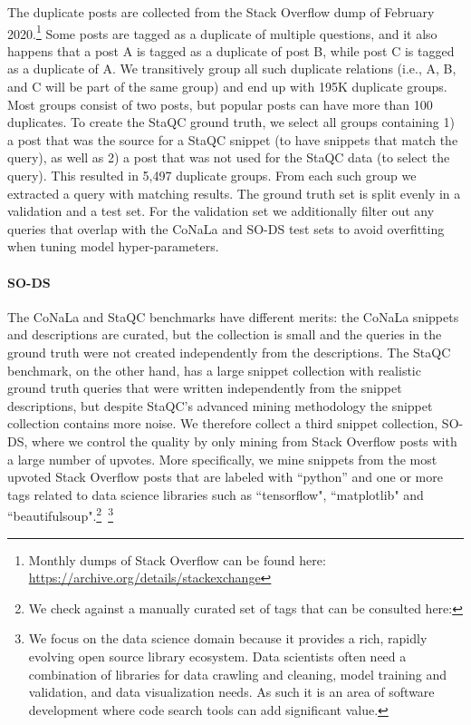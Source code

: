 \documentclass[12pt,conference, onecolumn]{IEEEtran}
\begin{document}
The duplicate posts are collected from the Stack Overflow dump of February 2020.\footnote{Monthly dumps of Stack Overflow can be found here:  \url{https://archive.org/details/stackexchange}} Some posts are tagged as a duplicate of multiple questions, and it also happens that a post A is tagged as a duplicate of post B, while post C is tagged as a duplicate of A. We transitively group all such duplicate relations (i.e., A, B, and C will be part of the same group) and end up with 195K duplicate groups. Most groups consist of two posts, but popular posts can have more than 100 duplicates. To create the StaQC ground truth, we select all groups containing  1) a post that was the source for a StaQC snippet (to have snippets that match the query), as well as 2) a post that was not used for the StaQC data (to select the query). This resulted in 5,497 duplicate groups. From each such group we extracted a query with matching results. The ground truth set is split evenly in a validation and a test set. For the validation set we additionally filter out any queries that overlap with the CoNaLa and SO-DS test sets to avoid overfitting when tuning model hyper-parameters.

\paragraph{SO-DS}
The CoNaLa and StaQC benchmarks have different merits: the CoNaLa snippets and descriptions are curated, but the collection is small and the queries in the ground truth were not created independently from the descriptions. The StaQC benchmark, on the other hand, has a large snippet collection with realistic ground truth queries that were written independently from the snippet descriptions, but despite StaQC's advanced mining methodology the snippet collection contains more noise. We therefore collect a third snippet collection, SO-DS, where we control the quality by only mining from Stack Overflow posts with a large number of upvotes. More specifically, we mine snippets from the most upvoted Stack Overflow posts that are labeled with ``python'' and one or more tags related to data science libraries such as ``tensorflow", ``matplotlib" and ``beautifulsoup".\footnote{We check against a manually curated set of tags that can be consulted here: \tagseturl}~\footnote{We focus on the data science domain because it provides a rich, rapidly evolving open source library ecosystem. Data scientists often need a combination of libraries for data crawling and cleaning, model training and validation, and data visualization needs. As such it is an area of software development where code search tools can add significant value.} 
\end{document}
